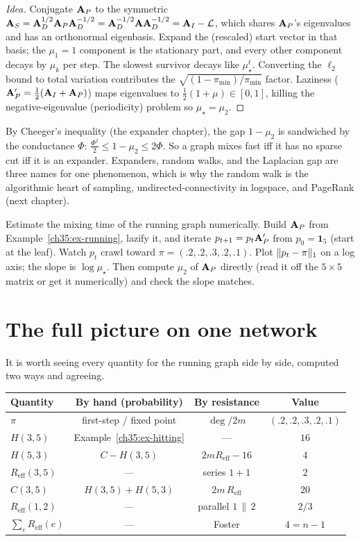 \begin{proof}[Idea]
Conjugate $\mathbf{A}_P$ to the symmetric $\mathbf{A}_S=\mathbf{A}_D^{1/2}\mathbf{A}_P\mathbf{A}_D^{-1/2}=\mathbf{A}_D^{-1/2}\mathbf{A}\mathbf{A}_D^{-1/2}=\mathbf{A}_I-\mathcal{L}$, which shares $\mathbf{A}_P$'s eigenvalues and has an orthonormal eigenbasis. Expand the (rescaled) start vector in that basis; the $\mu_1=1$ component is the stationary part, and every other component decays by $\mu_k$ per step. The slowest survivor decays like $\mu_\star^t$. Converting the $\ell_2$ bound to total variation contributes the $\sqrt{(1-\pi_{\min})/\pi_{\min}}$ factor. Laziness ($\mathbf{A}_P'=\tfrac12(\mathbf{A}_I+\mathbf{A}_P)$) maps eigenvalues to $\tfrac12(1+\mu)\in[0,1]$, killing the negative-eigenvalue (periodicity) problem so $\mu_\star=\mu_2$.
\end{proof}

By Cheeger's inequality (the expander chapter), the gap $1-\mu_2$ is sandwiched by the conductance $\Phi$: $\tfrac{\Phi^2}{2}\le 1-\mu_2\le 2\Phi$. So a graph mixes fast iff it has no sparse cut iff it is an expander. Expanders, random walks, and the Laplacian gap are three names for one phenomenon, which is why the random walk is the algorithmic heart of sampling, undirected-connectivity in logspace, and PageRank (next chapter).

\begin{labbox}
Estimate the mixing time of the running graph numerically. Build $\mathbf{A}_P$ from Example~\ref{ch35:ex-running}, lazify it, and iterate $p_{t+1}=p_t\mathbf{A}_P'$ from $p_0=\mathbf{1}_5$ (start at the leaf). Watch $p_t$ crawl toward $\pi=(.2,.2,.3,.2,.1)$. Plot $\lVert p_t-\pi\rVert_1$ on a log axis; the slope is $\log\mu_\star$. Then compute $\mu_2$ of $\mathbf{A}_P$ directly (read it off the $5\times5$ matrix or get it numerically) and check the slope matches.
\end{labbox}

\section{The full picture on one network}

It is worth seeing every quantity for the running graph side by side, computed two ways and agreeing.

\begin{center}
\begin{tabular}{lccc}
\toprule
Quantity & By hand (probability) & By resistance & Value\\
\midrule
$\pi$ & first-step / fixed point & $\deg/2m$ & $(.2,.2,.3,.2,.1)$\\
$H(3,5)$ & Example~\ref{ch35:ex-hitting} & --- & $16$\\
$H(5,3)$ & $C-H(3,5)$ & $2m R_{\mathrm{eff}}-16$ & $4$\\
$R_{\mathrm{eff}}(3,5)$ & --- & series $1{+}1$ & $2$\\
$C(3,5)$ & $H(3,5){+}H(5,3)$ & $2m\,R_{\mathrm{eff}}$ & $20$\\
$R_{\mathrm{eff}}(1,2)$ & --- & parallel $1\,\|\,2$ & $2/3$\\
$\sum_e R_{\mathrm{eff}}(e)$ & --- & Foster & $4=n{-}1$\\
\bottomrule
\end{tabular}
\end{center}

